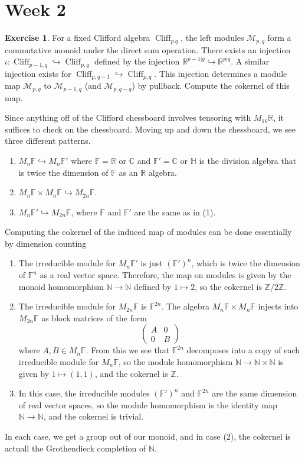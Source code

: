 \documentclass[psamsfonts]{amsart}
\theoremstyle{definition}
\newtheorem{exer}[thm]{Exercise}
\theoremstyle{remark}
\newcommand{\R}{\mathbb{R}}
\newcommand{\Z}{\mathbb{Z}}
\newcommand{\N}{\mathbb{N}}
\renewcommand{\H}{\mathbb{H}}
\newcommand{\C}{\mathbb{C}}
\newcommand{\F}{\mathbb{F}}
\DeclareMathOperator{\Cliff}{Cliff}
\begin{document}
\section*{Week 2}
%
\begin{exer}
For a fixed Clifford algebra $\Cliff_{p.q}$, the left modules $\mathcal{M}_{p,q}$ form a commutative monoid under the direct sum operation. There exists an injection $\iota : \Cliff_{p-1,q} \hookrightarrow \Cliff_{p,q}$ defined by the injection $\R^{p-1|q} \hookrightarrow \R^{p|q}$. A similar injection exists for $\Cliff_{p,q-1} \hookrightarrow \Cliff_{p,q}$. This injection determines a module map $\mathcal{M}_{p,q}$ to $\mathcal{M}_{p-1,q}$ (and $\mathcal{M}_{p,q-q}$) by pullback. Compute the cokernel of this map.
\end{exer}
%
Since anything off of the Clifford chessboard involves tensoring with $M_{16}\R$, it suffices to check on the chessboard. Moving up and down the chessboard, we see three different patterns.
\begin{enumerate}
\item $M_n\F \hookrightarrow M_n\F'$ where $\F = \R$ or $\C$ and $\F' = \C$ or $\H$ is the division algebra that is twice the dimension of $\F$ as an $\R$ algebra.
\item $M_n\F \times M_n\F \hookrightarrow M_{2n}\F$.
\item $M_{n}\F' \hookrightarrow M_{2n}\F$, where $\F$ and $\F'$ are the same as in (1).
\end{enumerate}
%
Computing the cokernel of the induced map of modules can be done essentially by dimension counting
\begin{enumerate}
\item The irreducible module for $M_n\F'$ is just $(\F')^n$, which is twice the dimension of $\F^n$ as a real vector space. Therefore, the map on modules is given by the monoid homomorphism $\N \to \N$ defined by $1 \mapsto 2$, so the cokernel is $\Z / 2\Z$.
\item The irreducible module for $M_{2n}\F$ is $\F^{2n}$. The algebra $M_n\F \times M_n\F$ injects into $M_{2n}\F$ as block matrices of the form
\[
\begin{pmatrix}
A & 0 \\
0 & B
\end{pmatrix}
\]
where $A,B \in M_n\F$. From this we see that $\F^{2n}$ decomposes into a copy of each irreducible module for $M_n\F$, so the module homomorphism $\N \to \N\times\N$ is given by $1 \mapsto (1,1)$, and the cokernel is $\Z$.
\item In this case, the irreducible modules $(\F')^n$ and $\F^{2n}$ are the same dimension of real vector spaces, so the module homomorphism is the identity map $\N \to \N$, and the cokernel is trivial. 
\end{enumerate}
%
In each case, we get a group out of our monoid, and in case (2), the cokernel is actuall the Grothendieck completion of $\N$.
%
\end{document}
